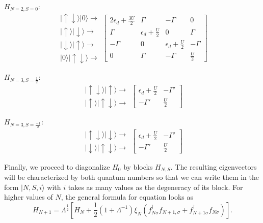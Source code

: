 $H_{N=2,S=0}:$
\[
\begin{array}{c}
\vert\uparrow\!\downarrow\rangle\vert0\rangle\rightarrow\\
\vert\uparrow\rangle\vert\downarrow\rangle\rightarrow\\
\vert\downarrow\rangle\vert\uparrow\rangle\rightarrow\\
\vert0\rangle\vert\uparrow\!\downarrow\rangle\rightarrow
\end{array}\left[\begin{array}{cccc}
2\epsilon_{d}+\frac{3U}{2} & \Gamma & -\Gamma & 0\\
\Gamma & \epsilon_{d}+\frac{U}{2} & 0 & \Gamma\\
-\Gamma & 0 & \epsilon_{d}+\frac{U}{2} & -\Gamma\\
0 & \Gamma & -\Gamma & \frac{U}{2}
\end{array}\right]
\]


\begin{multicols}{2}

$H_{N=3,S=\frac{1}{2}}:$
\[
\begin{array}{c}
\vert\uparrow\!\downarrow\rangle\vert\uparrow\rangle\rightarrow\\
\vert\uparrow\rangle\vert\uparrow\!\downarrow\rangle\rightarrow
\end{array}\left[\begin{array}{cc}
\epsilon_{d}+\frac{U}{2} & -\Gamma'\\
-\Gamma' & \frac{U}{2}
\end{array}\right]
\]


$H_{N=3,S=\frac{-1}{2}}:$
\[
\begin{array}{c}
\vert\uparrow\!\downarrow\rangle\vert\downarrow\rangle\rightarrow\\
\vert\downarrow\rangle\vert\uparrow\!\downarrow\rangle\rightarrow
\end{array}\left[\begin{array}{cc}
\epsilon_{d}+\frac{U}{2} & -\Gamma'\\
-\Gamma' & \frac{U}{2}
\end{array}\right]
\]


\end{multicols}

Finally, we proceed to diagonalize $H_{0}$ by blocks $H_{N,S}$.
The resulting eigenvectors will be characterized by both quantum numbers
so that we can write them in the form $\vert N,S,i\rangle$ with $i$
takes as many values as the degeneracy of its block. For higher values of $N$,
the general formula for equation  looks as 
\begin{equation}
H_{N+1}=\Lambda^{\frac{1}{2}}\left[H_{N}+\frac{1}{2}\left(1+\Lambda^{-1}\right)\xi_{N}\left(f_{N\sigma}^{\dagger}f_{N+1,\sigma}+f_{N+1\sigma}^{\dagger}f_{N\sigma}\right)\right].\label{eq:NRG-Iteration Hamiltonians}
\end{equation}


